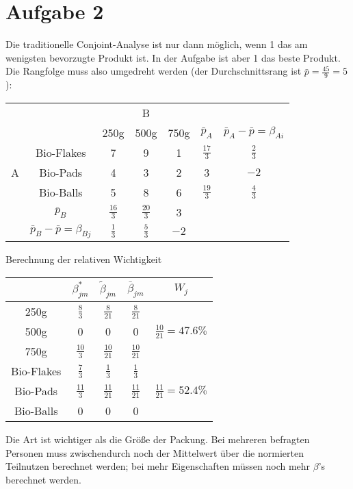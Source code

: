 \documentclass{article}
\begin{document}
	\section*{Aufgabe 2}
	Die traditionelle Conjoint-Analyse ist nur dann möglich, wenn 1 das am wenigsten bevorzugte Produkt ist. In der Aufgabe ist aber 1 das beste Produkt. Die Rangfolge muss also umgedreht werden (der Durchschnittsrang ist $\bar{p}=\frac{45}{9}=5$):
	\begin{center}
		\begin{tabular}{cc|ccc|c|c}
			&& \multicolumn{3}{c|}{B} & & \\
			&& 250g & 500g & 750g & $\bar{p}_A$ & $\bar{p}_A-\bar{p} = \beta_{Ai}$ \\
			\hline
			& Bio-Flakes & 7 & 9 & 1 & $\frac{17}{3}$ & $\frac{2}{3}$ \\
			A & Bio-Pads & 4 & 3 & 2 & 3 & $-2$ \\
			& Bio-Balls & 5 & 8 & 6 & $\frac{19}{3}$ & $\frac{4}{3}$ \\
			\hline
			& $\bar{p}_B$ & $\frac{16}{3}$ & $\frac{20}{3}$ & 3 & \multicolumn{2}{c}{ } \\
			& $\bar{p}_B-\bar{p} = \beta_{Bj}$ & $\frac{1}{3}$ & $\frac{5}{3}$ & $-2$ & \multicolumn{2}{c}{ }
		\end{tabular}
	\end{center}
	Berechnung der relativen Wichtigkeit
	\begin{center}
		\begin{tabular}{c|c|c|c|c}
			& $\beta^\ast_{jm}$ & $\tilde{\beta}_{jm}$ & $\bar{\beta}_{jm}$ & $W_j$ \\
			\hline
			250g & $\frac{8}{3}$ & $\frac{8}{21}$ & $\frac{8}{21}$ & \\
			500g & 0 & 0 & 0 & $\frac{10}{21}=47.6\%$ \\
			750g & $\frac{10}{3}$ & $\frac{10}{21}$ & $\frac{10}{21}$ & \\
			\hline
			Bio-Flakes & $\frac{7}{3}$ & $\frac{1}{3}$ & $\frac{1}{3}$ & \\
			Bio-Pads & $\frac{11}{3}$ & $\frac{11}{21}$ & $\frac{11}{21}$ & $\frac{11}{21}=52.4\%$ \\
			Bio-Balls & 0 & 0 & 0 &
		\end{tabular}
	\end{center}
	Die Art ist wichtiger als die Größe der Packung. Bei mehreren befragten Personen muss zwischendurch noch der Mittelwert über die normierten Teilnutzen berechnet werden; bei mehr Eigenschaften müssen noch mehr $\beta$'s berechnet werden.
	
\end{document}
